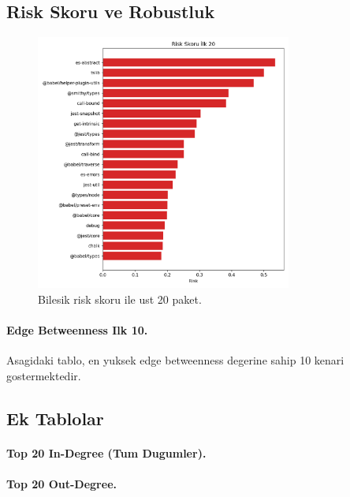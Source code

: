 \documentclass[11pt,a4paper]{article}
\begin{document}
\subsection{Risk Skoru ve Robustluk}
\begin{figure}[h]
  \centering
  \includegraphics[width=0.75\textwidth]{top20_risk.png}
  \caption{Bilesik risk skoru ile ust 20 paket.}
\end{figure}

\paragraph{Edge Betweenness Ilk 10.} Asagidaki tablo, en yuksek edge betweenness degerine sahip 10 kenari gostermektedir.

\subsection{Ek Tablolar}
\paragraph{Top 20 In-Degree (Tum Dugumler).}

\paragraph{Top 20 Out-Degree.}
\end{document}
